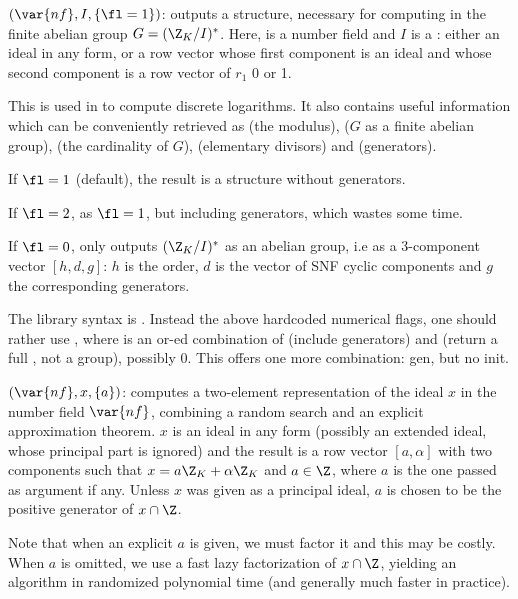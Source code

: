 $(\var{nf},I,\{\fl=1\})$: \label{se:idealstar}outputs a  structure,
necessary for computing in the finite abelian group $G = (\Z_K/I)^*$. Here,
 is a number field and $I$ is a : either an ideal in any
form, or a row vector whose first component is an ideal and whose second
component is a row vector of $r_1$ 0 or 1.

This  is used in  to compute discrete logarithms. It
also contains useful information which can be conveniently retrieved as
 (the modulus),
 ($G$ as a finite abelian group),
 (the cardinality of $G$),
 (elementary divisors) and
 (generators).

If $\fl=1$ (default), the result is a  structure without
generators.

If $\fl=2$, as $\fl=1$, but including generators, which wastes some time.

If $\fl=0$, only outputs $(\Z_K/I)^*$ as an abelian group,
i.e as a 3-component vector $[h,d,g]$: $h$ is the order, $d$ is the vector of
SNF cyclic components and $g$ the corresponding
generators.

The library syntax is .
Instead the above hardcoded numerical flags, one should rather use
, where  is
an or-ed combination of  (include generators) and 
(return a full , not a group), possibly $0$. This offers
one more combination: gen, but no init.

$(\var{nf},x,\{a\})$: \label{se:idealtwoelt}computes a two-element
representation of the ideal $x$ in the number field $\var{nf}$, combining a
random search and an explicit approximation theorem. $x$ is an ideal
in any form (possibly an extended ideal, whose principal part is ignored)
and the
result is a row vector $[a,\alpha]$ with two components such that
$x=a\Z_K+\alpha\Z_K$ and $a\in\Z$, where $a$ is the one passed as argument if
any. Unless $x$ was given as a principal ideal, $a$ is chosen to be the
positive generator of $x\cap\Z$.

Note that when an explicit $a$ is given, we must factor it and this may
be costly. When $a$ is omitted, we use a fast lazy factorization of $x\cap
\Z$, yielding an algorithm in randomized polynomial time (and generally
much faster in practice).

